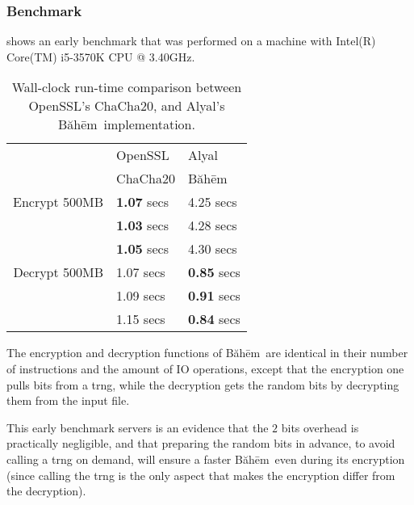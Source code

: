 \documentclass[twocolumn,hidelinks]{article}
\newcommand{\baheem}{Băhēm}
\begin{document}
\subsubsection{Benchmark}
 shows an early benchmark that was performed on a
machine with Intel(R) Core(TM) i5-3570K CPU @ 3.40GHz.

\begin{table}[tbh]
    \centering
    \begin{tabular}{rll}
                        & OpenSSL   & Alyal\\
                        & ChaCha20  & \baheem\\\hline
        Encrypt 500MB   & \textbf{1.07} secs & 4.25 secs\\
                        & \textbf{1.03} secs & 4.28 secs\\
                        & \textbf{1.05} secs & 4.30 secs\\\hline
        Decrypt 500MB   & 1.07 secs & \textbf{0.85} secs\\
                        & 1.09 secs & \textbf{0.91} secs\\
                        & 1.15 secs & \textbf{0.84} secs\\
    \end{tabular}
    \caption{Wall-clock run-time comparison between OpenSSL's ChaCha20, and
    Alyal's \baheem\ implementation.}
    \label{tbl_benchmark}
\end{table}

The encryption and decryption functions of \baheem\ are identical in their
number of instructions and the amount of IO operations, except that the
encryption one pulls bits from a \gls{trng}, while the decryption gets the
random bits by decrypting them from the input file.

This early benchmark servers is an evidence that the $2$ bits overhead is
practically negligible, and that preparing the random bits in advance, to
avoid calling a \gls{trng} on demand, will ensure a faster \baheem\ even
during its encryption (since calling the \gls{trng} is the only aspect that
makes the encryption differ from the decryption).
\end{document}
